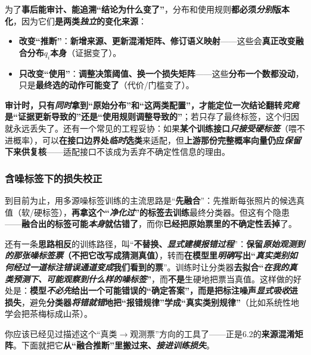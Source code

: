 为了\textbf{事后能审计、能追溯“结论为什么变了”}，分布和使用规则\textbf{都必须\emph{分别}版本化}，因为它们\textbf{是两类\emph{独立}的变化来源}：
\begin{itemize}\item \textbf{改变“推断”}：\textbf{新增来源、更新混淆矩阵、修订语义映射}——这些会\textbf{真正改变融合分布$q_i$本身}（证据变了）。\item \textbf{只改变“使用”}：\textbf{调整决策阈值、换一个损失矩阵}——这些\textbf{分布一个数都没动}，只是\textbf{最终选的动作可能变了}（代价/门槛变了）。\end{itemize}
\textbf{审计时，只有\emph{同时}拿到“原始分布”和“这两类配置”，才能定位一次结论翻转\emph{究竟}是“证据更新导致的”还是“使用规则调整导致的”}；若只存了最终标签，这个归因就永远丢失了。还有一个常见的工程妥协：如果\textbf{某个训练接口\emph{只接受硬标签}}（喂不进概率），可以\textbf{在接口边界处\emph{临时}选类}来适配，但\textbf{上游那份完整概率向量仍应\emph{保留}下来供复核}——适配接口不该成为丢弃不确定性信息的理由。

\subsubsection{含噪标签下的损失校正}
\label{sec:ka-noise-correction}

到目前为止，用多源噪标签训练的主流思路是“\textbf{先融合}”：先推断每张照片的候选真值（软/硬标签），\textbf{再拿这个“\emph{净化过}”的标签去训练}最终分类器。但这有个隐患——\textbf{融合出的标签可能\emph{本身}就估错了}，而你\textbf{已经把原始票里的不确定性丢掉}了。

还有一条\textbf{思路相反}的训练路径，叫“\textbf{不替换、\emph{显式建模报错过程}}”：\textbf{保留\emph{原始观测到的那张噪标签票}（不把它改写成猜测真值）}，转而\textbf{在模型里\emph{明确}写出“\emph{真实类别}\emph{如何经过一道\emph{标注错误}通道}\emph{变成}我们看到的票}”。训练时让分类器\textbf{去拟合“\emph{在我的真类预测下、\emph{可能观察到}什么样的噪标签}”}，而\textbf{不是}生硬地把票当真值。这样做的好处是：\textbf{模型\emph{不必先}给出一个可能错误的“确定答案”，而是把标注噪声\emph{显式吸收}进损失}，避免\textbf{分类器\emph{将错就错}地把“报错规律”学成“真实类别规律”}（比如系统性地学会把茶梅标成山茶）。

你应该已经见过描述这个“真类$\to$观测票”方向的工具了——正是6.2的\textbf{来源混淆矩阵}。下面就把它\textbf{从“融合推断”里搬过来、\emph{接进训练损失}}。

